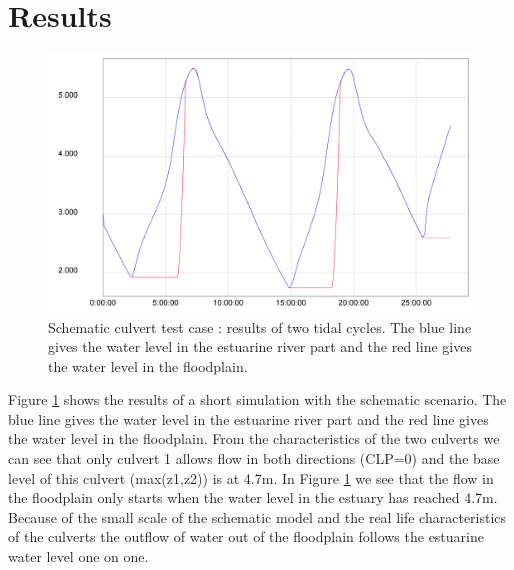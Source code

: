\section{Results}

\begin{figure}[h]
\begin{center}
	\includegraphics[scale=0.14]{figure2.png}
\end{center}
\caption{Schematic culvert test case : results of two tidal cycles. 
The blue line gives the water level in the estuarine river part and the red line gives the water level in the floodplain.}
\label{fig:culvert_figure2}
\end{figure}

Figure \ref{fig:culvert_figure2} shows the results of a short simulation with the schematic scenario. 
The blue line gives the water level in the estuarine river part and the red line gives the water level in the floodplain. 
From the characteristics of the two culverts we can see that only culvert 1 allows flow in both directions (CLP=0) 
and the base level of this culvert (max(z1,z2)) is at 4.7m. 
In Figure \ref{fig:culvert_figure2} we see that the flow in the floodplain only starts when the water level in the estuary has reached 4.7m. 
Because of the small scale of the schematic model and the real life characteristics of the culverts the outflow 
of water out of the floodplain follows the estuarine water level one on one.

